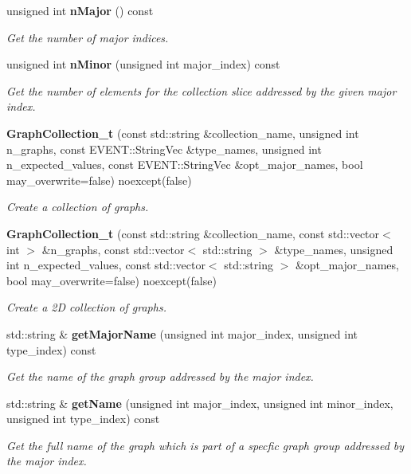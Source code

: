 \begin{DoxyCompactItemize}
\item 
unsigned int {\bf n\-Major} () const 
\begin{DoxyCompactList}\small\item\em Get the number of major indices. \end{DoxyCompactList}\item 
unsigned int {\bf n\-Minor} (unsigned int major\-\_\-index) const 
\begin{DoxyCompactList}\small\item\em Get the number of elements for the collection slice addressed by the given major index. \end{DoxyCompactList}\item 
{\bf Graph\-Collection\-\_\-t} (const std\-::string \&collection\-\_\-name, unsigned int n\-\_\-graphs, const E\-V\-E\-N\-T\-::\-String\-Vec \&type\-\_\-names, unsigned int n\-\_\-expected\-\_\-values, const E\-V\-E\-N\-T\-::\-String\-Vec \&opt\-\_\-major\-\_\-names, bool may\-\_\-overwrite=false) noexcept(false)
\begin{DoxyCompactList}\small\item\em Create a collection of graphs. \end{DoxyCompactList}\item 
{\bf Graph\-Collection\-\_\-t} (const std\-::string \&collection\-\_\-name, const std\-::vector$<$ int $>$ \&n\-\_\-graphs, const std\-::vector$<$ std\-::string $>$ \&type\-\_\-names, unsigned int n\-\_\-expected\-\_\-values, const std\-::vector$<$ std\-::string $>$ \&opt\-\_\-major\-\_\-names, bool may\-\_\-overwrite=false) noexcept(false)
\begin{DoxyCompactList}\small\item\em Create a 2\-D collection of graphs. \end{DoxyCompactList}\item 
std\-::string \& {\bf get\-Major\-Name} (unsigned int major\-\_\-index, unsigned int type\-\_\-index) const 
\begin{DoxyCompactList}\small\item\em Get the name of the graph group addressed by the major index. \end{DoxyCompactList}\item 
std\-::string \& {\bf get\-Name} (unsigned int major\-\_\-index, unsigned int minor\-\_\-index, unsigned int type\-\_\-index) const 
\begin{DoxyCompactList}\small\item\em Get the full name of the graph which is part of a specfic graph group addressed by the major index. \end{DoxyCompactList}\item 

\end{DoxyCompactItemize}
